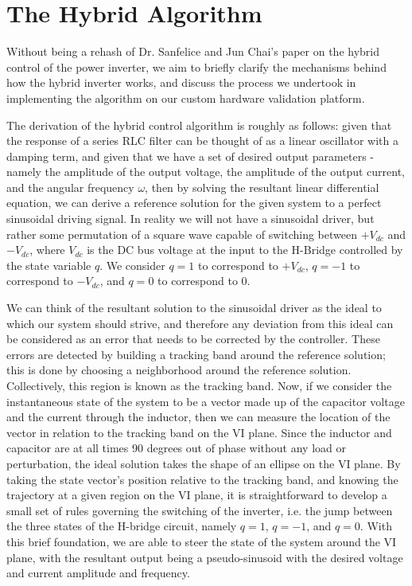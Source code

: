 \section{The Hybrid Algorithm}
Without being a rehash of Dr. Sanfelice and Jun Chai's paper on the hybrid control of the power inverter\cite{ricardo}, we aim to briefly clarify the mechanisms behind how the hybrid inverter works, and discuss the process we undertook in implementing the algorithm on our custom hardware validation platform. 

The derivation of the hybrid control algorithm is roughly as follows: given that the response of a series RLC filter can be thought of as a linear oscillator with a damping term, and given that we have a set of desired output parameters - namely the amplitude of the output voltage, the amplitude of the output current, and the angular frequency $\omega$, then by solving the resultant linear differential equation, we can derive a reference solution for the given system to a perfect sinusoidal driving signal. In reality we will not have a sinusoidal driver, but rather some permutation of a square wave capable of switching between $+V_{dc}$ and $-V_{dc}$, where $V_{dc}$ is the DC bus voltage at the input to the H-Bridge controlled by the state variable $q$. We consider $q=1$ to correspond to $+V_{dc}$, $q=-1$ to correspond to $-V_{dc}$, and $q=0$ to correspond to $0$.   

We can think of the resultant solution to the sinusoidal driver as the ideal to which our system should strive, and therefore any deviation from this ideal can be considered as an error that needs to be corrected by the controller. These errors are detected by building a tracking band around the reference solution; this is done by choosing a neighborhood around the reference solution. Collectively, this region is known as the tracking band. Now, if we consider the instantaneous state of the system to be a vector made up of the capacitor voltage and the current through the inductor, then we can measure the location of the vector in relation to the tracking band on the VI plane. Since the inductor and capacitor are at all times 90 degrees out of phase without any load or perturbation, the ideal solution takes the shape of an ellipse on the VI plane. By taking the state vector's position relative to the tracking band, and knowing the trajectory at a given region on the VI plane, it is straightforward to develop a small set of rules governing the switching of the inverter, i.e. the jump between the three states of the H-bridge circuit, namely $q=1$, $q=-1$, and $q=0$. With this brief foundation, we are able to steer the state of the system around the VI plane, with the resultant output being a pseudo-sinusoid with the desired voltage and current amplitude and frequency. 

